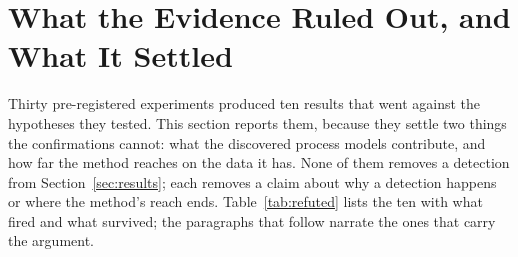 \documentclass[11pt,letterpaper]{article}
\begin{document}
\section{What the Evidence Ruled Out, and What It Settled}
\label{sec:falsified}

Thirty pre-registered experiments produced ten results that went against the hypotheses they tested. This section reports them, because they settle two things the confirmations cannot: what the discovered process models contribute, and how far the method reaches on the data it has. None of them removes a detection from Section~\ref{sec:results}; each removes a claim about why a detection happens or where the method's reach ends. Table~\ref{tab:refuted} lists the ten with what fired and what survived; the paragraphs that follow narrate the ones that carry the argument.
\end{document}
